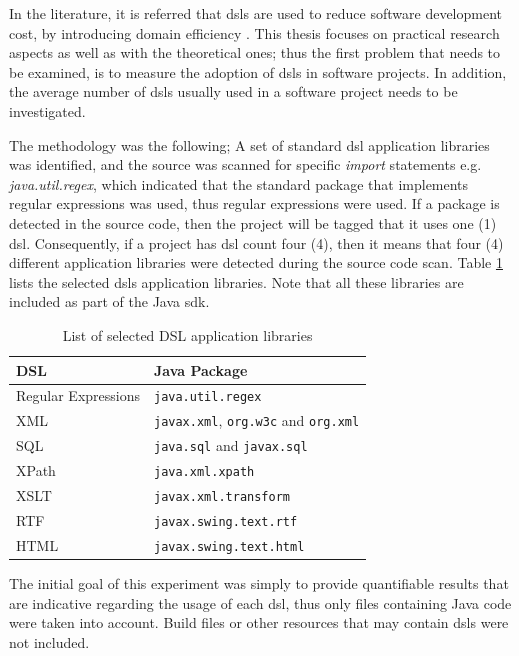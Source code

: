 \documentclass{sig-alternate}
\begin{document}
In the literature, it is referred that {\sc dsl}s are used to reduce software development cost, by introducing domain efficiency \cite{MHS05}. This thesis focuses on practical research aspects as well as with the theoretical ones; thus the first problem that needs to be examined, is to measure the adoption of {\sc dsl}s in software projects. In addition, the average number of {\sc dsl}s usually used in a software project needs to be investigated.

The methodology was the following; A set of standard {\sc dsl} application libraries was identified, and the source was scanned for specific \textit{import} statements e.g. \textit{java.util.regex}, which indicated that the standard package that implements regular expressions was used, thus regular expressions were used. If a package is detected in the source code, then the project will be tagged that it uses one (1) {\sc dsl}. Consequently, if a project has {\sc dsl} count four (4), then it means that four (4) different application libraries were detected during the source code scan. Table \ref{tbl:dsl-list} lists the selected {\sc dsl}s application libraries. Note that all these libraries are included as part of the Java {\sc sdk}.

\begin{table}
\centering
\caption{List of selected DSL application libraries}
\label{tbl:dsl-list}
\begin{tabular}{l l}
 \hline
\textbf{DSL} & \textbf{Java Package}\\
\hline
Regular Expressions & \verb|java.util.regex|\\
XML & \verb|javax.xml|, \verb|org.w3c| and \verb|org.xml|\\
SQL & \verb|java.sql| and \verb|javax.sql|\\
XPath & \verb|java.xml.xpath|\\
XSLT & \verb|javax.xml.transform|\\
RTF & \verb|javax.swing.text.rtf|\\
HTML & \verb|javax.swing.text.html|\\
\hline
\end{tabular}
\end{table}

The initial goal of this experiment was simply to provide quantifiable results that are indicative regarding the usage of each {\sc dsl}, thus only files containing Java code were taken into account. Build files or other resources that may contain {\sc dsl}s were not included.
\end{document}
